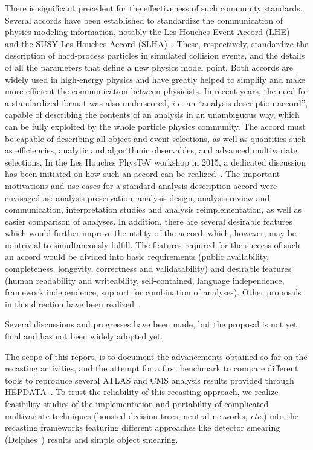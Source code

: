 \documentclass[11pt]{cernrep}
\begin{document}
There is significant precedent for the effectiveness of such community standards. Several
accords have been established to standardize the communication of physics modeling information,
notably the Les Houches Event Accord (LHE)~\cite{Boos:2001cv,Alwall:2006yp} and the SUSY Les Houches Accord (SLHA)~\cite{Allanach:2008qq,Skands:2003cj}.
These, respectively, standardize the description of hard-process
particles in simulated collision events, and the details of all the parameters that define a new physics model point.
Both accords are widely used in high-energy physics and have greatly helped to
simplify and make more efficient the communication between physicists.
In recent years, the need for a standardized format was also underscored,
{\it i.e.} an “analysis description
accord”, capable of describing the contents of an analysis in an unambiguous way, which can
be fully exploited by the whole particle physics community.  The accord must be capable of
describing all object and event selections, as well as quantities such as efficiencies, analytic and
algorithmic observables, and advanced multivariate selections.
In the Les Houches PhysTeV workshop in 2015, a dedicated discussion has been initiated
on how such an accord can be realized~\cite{Brooijmans:2016vro}.
The important motivations and use-cases for a standard analysis description accord were envisaged as:
analysis preservation, analysis design, analysis review and communication, interpretation studies and analysis reimplementation, as well as easier comparison of analyses.
In addition, there are several desirable features which would further improve the utility
of the accord, which, however, may be nontrivial to simultaneously fulfill.  
The features required for the success of such an accord would be divided into basic requirements (public availability, completeness, longevity, correctness and validatability) and desirable features (human readability and writeability, self-contained, language independence, framework independence, support for combination of analyses).
Other proposals in this direction have been realized~\cite{Collaboration:2242860,recasting_atlas}.

Several discussions and progresses have been made, but the proposal is not yet final and has not been widely adopted yet.

The scope of this report, is to document the advancements obtained so far
on the recasting activities, and the attempt for a first benchmark to compare different tools
to reproduce several ATLAS and CMS analysis results provided through HEPDATA~\cite{Maguire:2017ypu}.
To trust the reliability of this recasting approach, we realize feasibility studies of the implementation and portability of complicated multivariate techniques
(boosted
decision trees, neutral networks, {\it etc.}) into the recasting frameworks featuring different approaches like detector smearing (Delphes~\cite{deFavereau:2013fsa}) results and simple object smearing.
\end{document}
